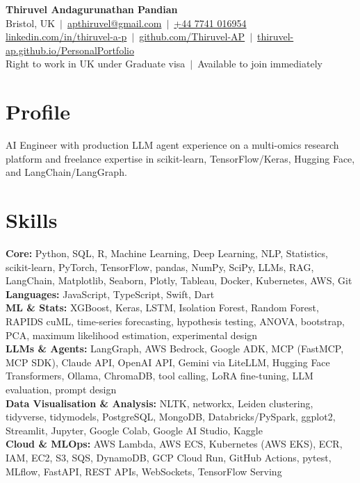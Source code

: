 \documentclass[a4paper,11pt]{article}
\begin{document}
\fontsize{11}{13.2}\selectfont

\begin{center}
  {\LARGE\bfseries Thiruvel Andagurunathan Pandian}\\[3pt]
  Bristol, UK \,$|$\, \href{mailto:apthiruvel@gmail.com}{apthiruvel@gmail.com} \,$|$\, \href{tel:+447741016954}{+44 7741 016954}\\[1pt]
\href{https://www.linkedin.com/in/thiruvel-a-p/}{linkedin.com/in/thiruvel-a-p} \,$|$\, \href{https://github.com/Thiruvel-AP}{github.com/Thiruvel-AP} \,$|$\, \href{https://thiruvel-ap.github.io/PersonalPortfolio/}{thiruvel-ap.github.io/PersonalPortfolio}\\[1pt]
  Right to work in UK under Graduate visa \,$|$\, Available to join immediately
\end{center}

\section{Profile}
AI Engineer with production LLM agent experience on a multi-omics research platform and freelance expertise in scikit-learn, TensorFlow/Keras, Hugging Face, and LangChain/LangGraph.

\section{Skills}
\textbf{Core:} Python, SQL, R, Machine Learning, Deep Learning, NLP, Statistics, scikit-learn, PyTorch, TensorFlow, pandas, NumPy, SciPy, LLMs, RAG, LangChain, Matplotlib, Seaborn, Plotly, Tableau, Docker, Kubernetes, AWS, Git\\[2pt]
\textbf{Languages:} JavaScript, TypeScript, Swift, Dart\\[2pt]
\textbf{ML \& Stats:} XGBoost, Keras, LSTM, Isolation Forest, Random Forest, RAPIDS cuML, time-series forecasting, hypothesis testing, ANOVA, bootstrap, PCA, maximum likelihood estimation, experimental design\\[2pt]
\textbf{LLMs \& Agents:} LangGraph, AWS Bedrock, Google ADK, MCP (FastMCP, MCP SDK), Claude API, OpenAI API, Gemini via LiteLLM, Hugging Face Transformers, Ollama, ChromaDB, tool calling, LoRA fine-tuning, LLM evaluation, prompt design\\[2pt]
\textbf{Data Visualisation \& Analysis:} NLTK, networkx, Leiden clustering, tidyverse, tidymodels, PostgreSQL, MongoDB, Databricks/PySpark, ggplot2, Streamlit, Jupyter, Google Colab, Google AI Studio, Kaggle\\[2pt]
\textbf{Cloud \& MLOps:} AWS Lambda, AWS ECS, Kubernetes (AWS EKS), ECR, IAM, EC2, S3, SQS, DynamoDB, GCP Cloud Run, GitHub Actions, pytest, MLflow, FastAPI, REST APIs, WebSockets, TensorFlow Serving
\end{document}
